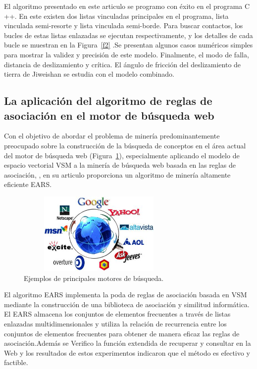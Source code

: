 \documentclass[10pt,journal]{IEEEtran}
\begin{document}
El algoritmo presentado en este articulo se programo con éxito en el programa C ++. En este existen dos listas vinculadas principales en el programa, lista vinculada semi-resorte y lista vinculada semi-borde. Para buscar contactos, los bucles de estas listas enlazadas se ejecutan respectivamente, y los detalles de cada bucle se muestran en la Figura~\ref{f2} .Se presentan algunos casos numéricos simples para mostrar la validez y precisión de este modelo. Finalmente, el modo de falla, distancia de deslizamiento y crítica. El ángulo de fricción del deslizamiento de tierra de Jiweishan se estudia con el modelo combinado.
\subsection{\textbf{La aplicación del algoritmo de reglas de asociación en el motor de búsqueda web}}
Con el objetivo de abordar el problema de minería predominantemente preocupado sobre la construcción de la búsqueda de conceptos en el área actual del motor de búsqueda web (Figura~\ref{f3}), especialmente aplicando el modelo de espacio vectorial VSM a la minería de búsqueda web basada en las reglas de asociación, \citep{lu}, en su articulo proporciona un algoritmo de minería altamente eficiente EARS.
\begin{figure}[H]
 \begin{center}
       \includegraphics[width=8cm, height=4cm]{figuras/3.JPG}
      \caption{Ejemplos de principales motores de búsqueda.}
      \label{f3} 
      \end{center}
\end{figure}
El algoritmo EARS implementa la poda de reglas de asociación basada en VSM mediante la construcción de una biblioteca de asociación y similitud informática. El EARS almacena los conjuntos de elementos frecuentes a través de listas enlazadas multidimensionales y utiliza la relación de recurrencia entre los conjuntos de elementos frecuentes para obtener de manera eficaz las reglas de asociación.Además se Verifico la función extendida de recuperar y consultar en la Web y los resultados de estos experimentos indicaron que el método es efectivo y factible.
\end{document}

